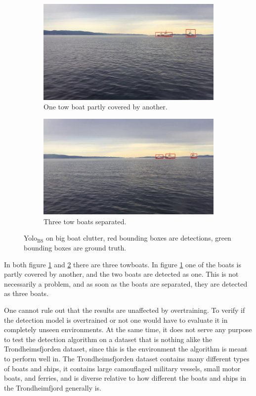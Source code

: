 \begin{figure}[h!]
\begin{subfigure}{.5\textwidth}
  \centering
  \includegraphics[width=0.8\linewidth]{results/video/video3/frame479.jpg}
  \caption{One tow boat partly covered by another.}
  \label{fig:yolo1_clut_tow}
\end{subfigure}%
\begin{subfigure}{.5\textwidth}
  \centering
  \includegraphics[width=.8\linewidth]{results/video/video3/frame677.jpg}
  \caption{Three tow boats separated.}
  \label{fig:yolo1_sep}
\end{subfigure}
\caption{Yolo$_{\text{BS}}$ on big boat clutter, red bounding boxes are detections, green bounding boxes are ground truth.}
\label{fig:yolo1_clutter}
\end{figure}

\noindent
In both figure \ref{fig:yolo1_clut_tow} and \ref{fig:yolo1_sep} there are three towboats. In figure \ref{fig:yolo1_clut_tow} one of the boats is partly covered by another, and the two boats are detected as one. This is not necessarily a problem, and as soon as the boats are separated, they are detected as three boats. 

\vspace{3mm}

\noindent
One cannot rule out that the results are unaffected by overtraining. To verify if the detection model is overtrained or not one would have to evaluate it in completely unseen environments. At the same time, it does not serve any purpose to test the detection algorithm on a dataset that is nothing alike the Trondheimsfjorden dataset, since this is the environment the algorithm is meant to perform well in. The Trondheimsfjorden dataset contains many different types of boats and ships, it contains large camouflaged military vessels, small motor boats, and ferries, and is diverse relative to how different the boats and ships in the Trondheimfjord generally is. 

